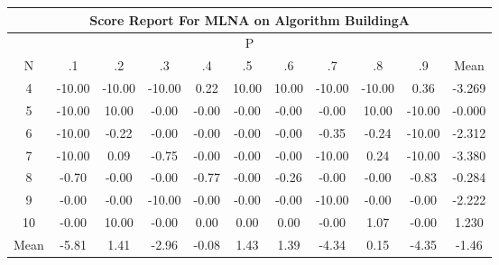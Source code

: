 \documentclass[11pt,a4paper]{report}
\begin{document}
\begin{longtable}{ | c || c | c | c | c | c | c | c | c | c || c |}
\hline
\multicolumn{11}{|c|}{ Score Report For MLNA on Algorithm BuildingA} \\
\hline
\multicolumn{11}{|c|}{ P } \\
\hline
N & .1 & .2 & .3 & .4 & .5 & .6 & .7 & .8 & .9 & Mean\\
 \hline
 \hline
 \endhead
  4 &  \cellcolor[HTML]{FF0000} -10.00 &  \cellcolor[HTML]{FF0000} -10.00 &  \cellcolor[HTML]{FF0000} -10.00 &  \cellcolor[HTML]{F7F7FF} 0.22 &  \cellcolor[HTML]{0808FF} 10.00 &  \cellcolor[HTML]{0808FF} 10.00 &  \cellcolor[HTML]{FF0000} -10.00 &  \cellcolor[HTML]{FF0000} -10.00 &  \cellcolor[HTML]{F7F7FF} 0.36 & -3.269 \\
  5 &  \cellcolor[HTML]{FF0000} -10.00 &  \cellcolor[HTML]{0808FF} 10.00 &  \cellcolor[HTML]{FFFFFF} -0.00 &  \cellcolor[HTML]{FFFFFF} -0.00 &  \cellcolor[HTML]{FFFFFF} -0.00 &  \cellcolor[HTML]{FFFFFF} -0.00 &  \cellcolor[HTML]{FFFFFF} -0.00 &  \cellcolor[HTML]{0808FF} 10.00 &  \cellcolor[HTML]{FF0000} -10.00 & -0.000 \\
  6 &  \cellcolor[HTML]{FF0000} -10.00 &  \cellcolor[HTML]{FFF7F7} -0.22 &  \cellcolor[HTML]{FFFFFF} -0.00 &  \cellcolor[HTML]{FFFFFF} -0.00 &  \cellcolor[HTML]{FFFFFF} -0.00 &  \cellcolor[HTML]{FFFFFF} -0.00 &  \cellcolor[HTML]{FFF7F7} -0.35 &  \cellcolor[HTML]{FFF7F7} -0.24 &  \cellcolor[HTML]{FF0000} -10.00 & -2.312 \\
  7 &  \cellcolor[HTML]{FF0000} -10.00 &  \cellcolor[HTML]{FFFFFF} 0.09 &  \cellcolor[HTML]{FFEFEF} -0.75 &  \cellcolor[HTML]{FFFFFF} -0.00 &  \cellcolor[HTML]{FFFFFF} -0.00 &  \cellcolor[HTML]{FFFFFF} -0.00 &  \cellcolor[HTML]{FF0000} -10.00 &  \cellcolor[HTML]{F7F7FF} 0.24 &  \cellcolor[HTML]{FF0000} -10.00 & -3.380 \\
  8 &  \cellcolor[HTML]{FFEFEF} -0.70 &  \cellcolor[HTML]{FFFFFF} -0.00 &  \cellcolor[HTML]{FFFFFF} -0.00 &  \cellcolor[HTML]{FFEFEF} -0.77 &  \cellcolor[HTML]{FFFFFF} -0.00 &  \cellcolor[HTML]{FFF7F7} -0.26 &  \cellcolor[HTML]{FFFFFF} -0.00 &  \cellcolor[HTML]{FFFFFF} -0.00 &  \cellcolor[HTML]{FFE7E7} -0.83 & -0.284 \\
  9 &  \cellcolor[HTML]{FFFFFF} -0.00 &  \cellcolor[HTML]{FFFFFF} -0.00 &  \cellcolor[HTML]{FF0000} -10.00 &  \cellcolor[HTML]{FFFFFF} -0.00 &  \cellcolor[HTML]{FFFFFF} -0.00 &  \cellcolor[HTML]{FFFFFF} -0.00 &  \cellcolor[HTML]{FF0000} -10.00 &  \cellcolor[HTML]{FFFFFF} -0.00 &  \cellcolor[HTML]{FFFFFF} -0.00 & -2.222 \\
  10 &  \cellcolor[HTML]{FFFFFF} -0.00 &  \cellcolor[HTML]{0808FF} 10.00 &  \cellcolor[HTML]{FFFFFF} -0.00 &  \cellcolor[HTML]{FFFFFF} 0.00 &  \cellcolor[HTML]{FFFFFF} 0.00 &  \cellcolor[HTML]{FFFFFF} 0.00 &  \cellcolor[HTML]{FFFFFF} -0.00 &  \cellcolor[HTML]{E7E7FF} 1.07 &  \cellcolor[HTML]{FFFFFF} -0.00 & 1.230 \\
 \hline
 \hline
Mean &  \cellcolor[HTML]{FF7070} -5.81 &  \cellcolor[HTML]{DFDFFF} 1.41 &  \cellcolor[HTML]{FFB7B7} -2.96 &  \cellcolor[HTML]{FFFFFF} -0.08 &  \cellcolor[HTML]{DFDFFF} 1.43 &  \cellcolor[HTML]{DFDFFF} 1.39 &  \cellcolor[HTML]{FF8F8F} -4.34 &  \cellcolor[HTML]{FFFFFF} 0.15 &  \cellcolor[HTML]{FF8F8F} -4.35 &  \cellcolor[HTML]{FFD7D7} -1.46
\end{longtable}
\end{document}
